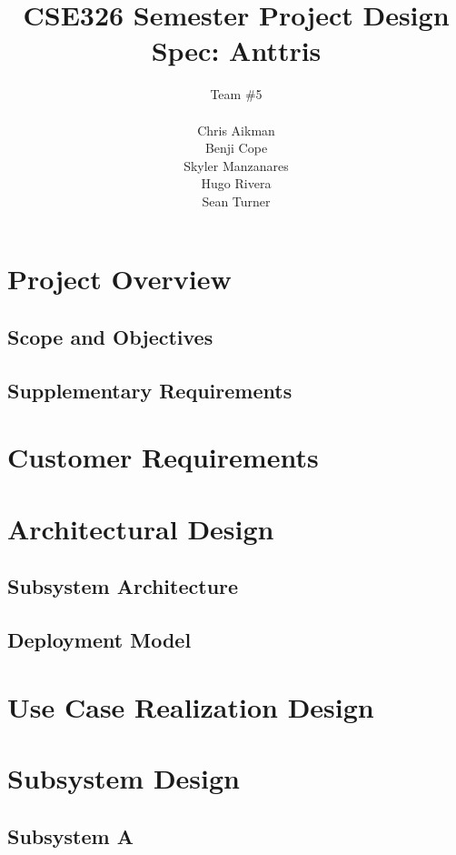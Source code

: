\documentclass[12pt]{article}
\begin{document}
\title{CSE326 Semester Project Design Spec: Anttris}
\author{Team \#5\\\\Chris Aikman\\Benji Cope\\Skyler Manzanares\\Hugo Rivera\\Sean Turner}
\maketitle

\section{Project Overview}
\subsection{Scope and Objectives}
\subsection{Supplementary Requirements}
\section{Customer Requirements}
\section{Architectural Design}
\subsection{Subsystem Architecture}
\subsection{Deployment Model}
\section{Use Case Realization Design}
\section{Subsystem Design}
\subsection{Subsystem A}
\end{document}
